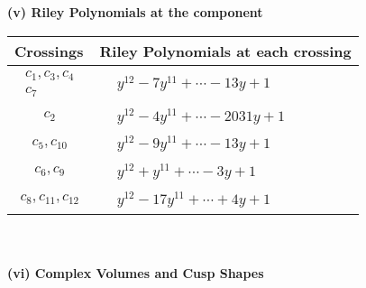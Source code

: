 \documentclass[1p]{elsarticle_modified}
\theoremstyle{definition}
\begin{document}
\flushleft \textbf{(v) Riley Polynomials at the component}\newline \\
\begin{tabular}{m{50pt}|m{274pt}}
Crossings & \hspace{64pt}Riley Polynomials at each crossing \\
\hline $$\begin{aligned}c_{1},c_{3},c_{4}\\c_{7}\end{aligned}$$&$\begin{aligned}
&y^{12}-7 y^{11}+\cdots-13 y+1
\end{aligned}$\\
\hline $$\begin{aligned}c_{2}\end{aligned}$$&$\begin{aligned}
&y^{12}-4 y^{11}+\cdots-2031 y+1
\end{aligned}$\\
\hline $$\begin{aligned}c_{5},c_{10}\end{aligned}$$&$\begin{aligned}
&y^{12}-9 y^{11}+\cdots-13 y+1
\end{aligned}$\\
\hline $$\begin{aligned}c_{6},c_{9}\end{aligned}$$&$\begin{aligned}
&y^{12}+y^{11}+\cdots-3 y+1
\end{aligned}$\\
\hline $$\begin{aligned}c_{8},c_{11},c_{12}\end{aligned}$$&$\begin{aligned}
&y^{12}-17 y^{11}+\cdots+4 y+1
\end{aligned}$\\
\hline
\end{tabular}\\~\\
\newpage\flushleft \textbf{(vi) Complex Volumes and Cusp Shapes}
\end{document}
